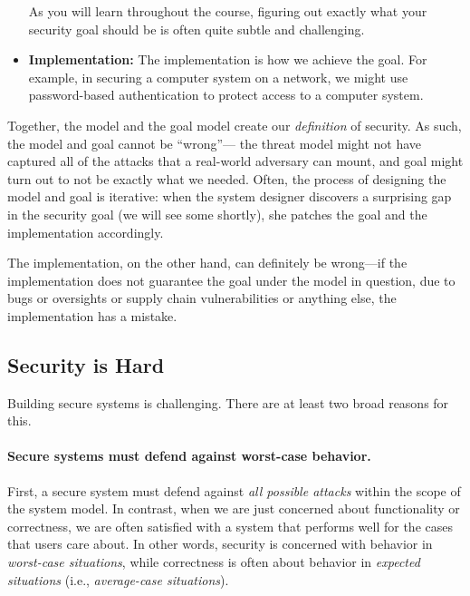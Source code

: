 \begin{itemize}
    As you will learn throughout the course, figuring out exactly what your
    security goal should be is often quite subtle and challenging.

  \item \textbf{Implementation:}
    The implementation is how we achieve the goal.
    For example, in securing a computer system on a network, we 
    might use password-based authentication to protect access to a computer system.
\end{itemize}

Together, the model and the goal model create our
\textit{definition} of security.
As such, the model and goal
cannot be ``wrong''---%
the threat model might not have captured all of
the attacks that a real-world adversary can mount,
and goal might turn out to
not be exactly what we needed.
Often, the process of designing the model and goal is iterative:
when the system designer discovers a surprising gap in the security
goal (we will see some shortly), she patches the goal and the implementation
accordingly.

The implementation, on the other hand, can definitely be wrong---if 
the implementation does not guarantee the goal
under the model in question, due to bugs or
oversights or supply chain vulnerabilities or
anything else, the implementation has a mistake.

\subsection{Security is Hard}

Building secure systems is challenging.
There are at least two broad reasons for this.

\paragraph{Secure systems must defend against worst-case behavior.}
First, a secure system must defend against
\emph{all possible attacks} within the scope of 
the system model.
In contrast, when we are just concerned about functionality or
correctness, we are often satisfied with a system 
that performs well for the cases that users care about.
In other words, security is concerned with behavior in
\emph{worst-case situations}, while correctness is often
about behavior in 
\emph{expected situations} (i.e., \emph{average-case situations}).

